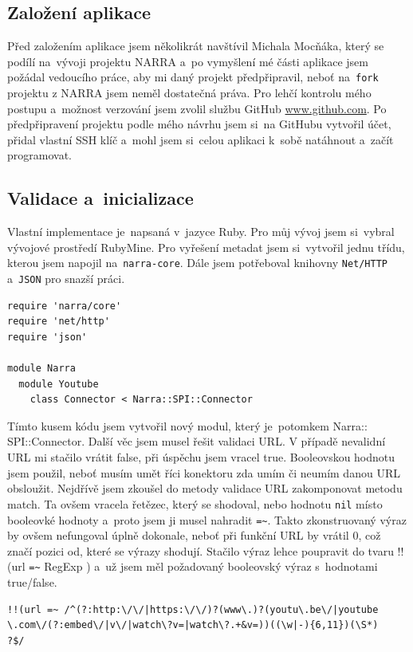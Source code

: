 \subsection{Založení aplikace}
\par Před založením aplikace jsem několikrát navštívil Michala Mocňáka, který se podílí na~vývoji projektu NARRA a~po vymyšlení mé části aplikace jsem požádal vedoucího práce, aby mi daný projekt předpřipravil, neboť na~\texttt{fork} projektu z NARRA jsem neměl dostatečná práva. Pro lehčí kontrolu mého postupu a~možnost verzování jsem zvolil službu GitHub \url{www.github.com}\cite{git}. Po předpřipravení projektu podle mého návrhu jsem si~na GitHubu vytvořil účet, přidal vlastní SSH klíč a~mohl jsem si~celou aplikaci k~sobě natáhnout a~začít programovat.

\subsection{Validace a~inicializace}
\par Vlastní implementace je~napsaná v~jazyce Ruby. Pro můj vývoj jsem si~vybral vývojové prostředí RubyMine. Pro vyřešení metadat jsem si~vytvořil jednu třídu, kterou jsem napojil na~\texttt{narra-core}. Dále jsem potřeboval knihovny \texttt{Net/HTTP} a~\texttt{JSON} pro snazší práci.
\begin{verbatim}
require 'narra/core'
require 'net/http'
require 'json'

module Narra
  module Youtube
    class Connector < Narra::SPI::Connector
\end{verbatim}
\par Tímto kusem kódu jsem vytvořil nový modul, který je~potomkem Narra::\\SPI::Connector. Další věc jsem musel řešit validaci URL. V případě nevalidní URL mi stačilo vrátit false, při úspěchu jsem vracel true. Booleovskou hodnotu jsem použil, neboť musím umět říci konektoru zda umím či neumím danou URL obsloužit. Nejdřívě jsem zkoušel do metody validace URL zakomponovat metodu match. Ta ovšem vracela řetězec, který se shodoval, nebo hodnotu \texttt{nil} místo booleovké hodnoty a~proto jsem ji musel nahradit \verb|=~|. Takto zkonstruovaný výraz by ovšem nefungoval úplně dokonale, neboť při funkční URL by vrátil 0, což značí pozici od, které se výrazy shodují. Stačilo výraz lehce poupravit do tvaru !!(url \verb|=~| RegExp ) a~už jsem měl požadovaný booleovský výraz s~hodnotami true/false.
\begin{verbatim}
!!(url =~ /^(?:http:\/\/|https:\/\/)?(www\.)?(youtu\.be\/|youtube
\.com\/(?:embed\/|v\/|watch\?v=|watch\?.+&v=))((\w|-){6,11})(\S*)
?$/
\end{verbatim}
